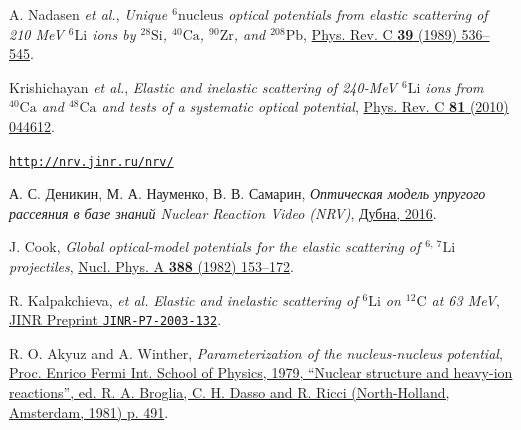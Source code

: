 \documentclass[a4paper, 12pt]{article}
\begin{document}
\begin{thebibliography}{99}
	 A. Nadasen \textit{et al.}, \textit{Unique $^{6}\mathrm{nucleus}$ optical potentials from elastic scattering of 210 MeV $^{6}\mathrm{Li}$ ions by $^{28}\mathrm{Si}$, $^{40}\mathrm{Ca}$, $^{90}\mathrm{Zr}$, and $^{208}\mathrm{Pb}$}, \href{http://dx.doi.org/10.1103/PhysRevC.39.536}{Phys. Rev. C \textbf{39} (1989) 536--545}.

	 Krishichayan \textit{et al.}, \textit{Elastic and inelastic scattering of 240-MeV $^{6}\mathrm{Li}$ ions from $^{40}\mathrm{Ca}$ and $^{48}\mathrm{Ca}$ and tests of a systematic optical potential}, \href{http://dx.doi.org/10.1103/PhysRevC.81.044612}{Phys. Rev. C \textbf{81} (2010) 044612}.

	 \texttt{\href{http://nrv.jinr.ru/nrv/}{http://nrv.jinr.ru/nrv/}}

	 А. С. Деникин, М. А. Науменко, В. В. Самарин, \textit{Оптическая модель упругого рассеяния в базе знаний Nuclear Reaction Video (NRV)}, \href{http://nrv.jinr.ru/nrv/OM-Tutorial.pdf}{Дубна, 2016}.

	 J. Cook, \textit{Global optical-model potentials for the elastic scattering of $^{6,\ 7}\mathrm{Li}$ projectiles}, \href{https://doi.org/10.1016/0375-9474(82)90513-9}{Nucl. Phys. A \textbf{388} (1982) 153--172}.

	 R. Kalpakchieva, \textit{et al.} \textit{Elastic and inelastic scattering of $^{6}\mathrm{Li}$ on $^{12}\mathrm{C}$ at 63 MeV}, \href{http://www1.jinr.ru/Preprints/2003/132(P7-2003-132).pdf}{JINR Preprint \texttt{JINR-P7-2003-132}}.

	 R. O. Akyuz and A. Winther, \textit{Parameterization of the nucleus-nucleus potential}, \href{http://nrv.jinr.ru/nrv/webnrv/elastic\_scattering/Akyuz.pdf}{Proc. Enrico Fermi Int. School of Physics, 1979, ``Nuclear structure and heavy-ion reactions'', ed. R. A. Broglia, C. H. Dasso and R. Ricci (North-Holland, Amsterdam, 1981) p. 491}.

\end{thebibliography}%
\end{document}
